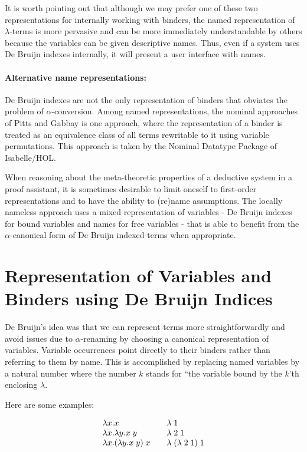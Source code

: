 It is worth pointing out that although we may prefer one of these two
representations for internally working with binders, the named
representation of $\lambda$-terms is more pervasive and can be more
immediately understandable by others because the variables can be
given descriptive names. Thus, even if a system uses De Bruijn indexes
internally, it will present a user interface with names.


\paragraph{Alternative name representations:}
De Bruijn indexes are not the only representation of binders that
obviates the problem of $\alpha$-conversion. Among named
representations, the nominal approaches of Pitts and Gabbay
\cite{Gabbay:LICS99} is one approach, where the representation of a
binder is treated as an equivalence class of all terms rewritable to
it using variable permutations. This approach is taken by the Nominal
Datatype Package of Isabelle/HOL.

When reasoning about the meta-theoretic properties of a deductive
system in a proof assistant, it is sometimes desirable to limit
oneself to first-order representations and to have the ability to
(re)name assumptions. The locally nameless approach
\cite{Aydemir:POPL08} uses a mixed representation of variables - De Bruijn indexes for bound variables and
names for free variables - that is able to benefit from the
$\alpha$-canonical form of De Bruijn indexed terms when appropriate.


\section{Representation of Variables and Binders using De Bruijn Indices}

De Bruijn's idea was that we can represent terms more
straightforwardly and avoid issues due to $\alpha$-renaming by
choosing a canonical representation of variables. Variable occurrences
point directly to their binders rather than referring to them by
name. This is accomplished by replacing named variables by a natural
number where the number $k$ stands for ``the variable bound by the
$k$'th enclosing $\lambda$.

Here are some examples:

\[
\begin{array}{l@{\qquad}l}
\lam x. x  & \lamdb 1 \\
\lam x. \lam y . x\;y & \lamdb 2\; 1\\
\lam x. (\lam y. x \; y)\; x & \lamdb (\lamdb 2\;1) \;1
\end{array}
\]

